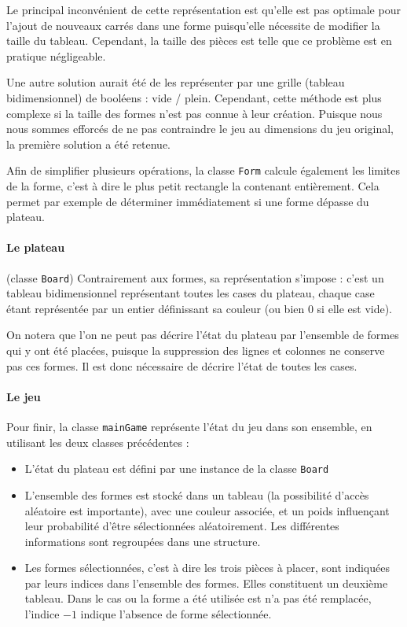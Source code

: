 \documentclass[11pt,a4paper]{article}
\begin{document}
Le principal inconvénient de cette représentation est qu'elle est pas optimale pour l'ajout de nouveaux carrés dans une forme puisqu'elle nécessite de modifier la taille du tableau. Cependant, la taille des pièces est telle que ce problème est en pratique négligeable.

Une autre solution aurait été de les représenter par une grille (tableau bidimensionnel) de booléens : vide / plein. Cependant, cette méthode est plus complexe si la taille des formes n'est pas connue à leur création. Puisque nous nous sommes efforcés de ne pas contraindre le jeu au dimensions du jeu original, la première solution a été retenue.

Afin de simplifier plusieurs opérations, la classe \verb"Form" calcule également les limites de la forme, c'est à dire le plus petit rectangle la contenant entièrement. Cela permet par exemple de déterminer immédiatement si une forme dépasse du plateau.

\paragraph{Le plateau} (classe \verb"Board")
Contrairement aux formes, sa représentation s'impose : c'est un tableau bidimensionnel représentant toutes les cases du plateau, chaque case étant représentée par un entier définissant sa couleur (ou bien 0 si elle est vide).

On notera que l'on ne peut pas décrire l'état du plateau par l'ensemble de formes qui y ont été placées, puisque la suppression des lignes et colonnes ne conserve pas ces formes. Il est donc nécessaire de décrire l'état de toutes les cases.

\paragraph{Le jeu} 
Pour finir, la classe \verb"mainGame" représente l'état du jeu dans son ensemble, en utilisant les deux classes précédentes :

\begin{itemize}
\item L'état du plateau est défini par une instance de la classe \verb"Board"
\item L'ensemble des formes est stocké dans un tableau (la possibilité d'accès aléatoire est importante), avec une couleur associée, et un poids influençant leur probabilité d'être sélectionnées aléatoirement. Les différentes informations sont regroupées dans une structure.
\item Les formes sélectionnées, c'est à dire les trois pièces à placer, sont indiquées par leurs indices dans l'ensemble des formes. Elles constituent un deuxième tableau. Dans le cas ou la forme a été utilisée est n'a pas été remplacée, l'indice $-1$ indique l'absence de forme sélectionnée.
\end{itemize}
\end{document}
